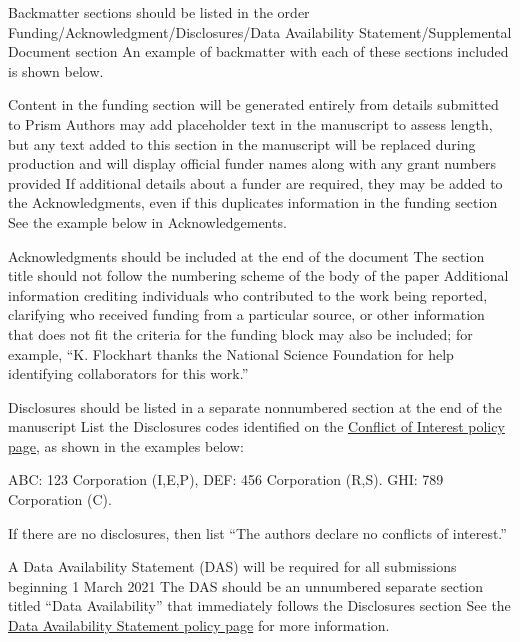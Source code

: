 \documentclass{osa-article}
\begin{document}
Backmatter sections should be listed in the order Funding/Acknowledgment/Disclosures/Data Availability Statement/Supplemental Document section
An example of backmatter with each of these sections included is shown below.

\begin{backmatter}
Content in the funding section will be generated entirely from details submitted to Prism
Authors may add placeholder text in the manuscript to assess length, but any text added to this section in the manuscript will be replaced during production and will display official funder names along with any grant numbers provided
If additional details about a funder are required, they may be added to the Acknowledgments, even if this duplicates information in the funding section
See the example below in Acknowledgements.

Acknowledgments should be included at the end of the document
The section title should not follow the numbering scheme of the body of the paper
Additional information crediting individuals who contributed to the work being reported, clarifying who received funding from a particular source, or other information that does not fit the criteria for the funding block may also be included; for example, ``K. Flockhart thanks the National Science Foundation for help identifying collaborators for this work.''

Disclosures should be listed in a separate nonnumbered section at the end of the manuscript
List the Disclosures codes identified on the \href{https://opg.optica.org/submit/review/conflicts-interest-policy.cfm}{Conflict of Interest policy page}, as shown in the examples below:

\medskip

\noindent ABC: 123 Corporation (I,E,P), DEF: 456 Corporation (R,S). GHI: 789 Corporation (C).

\medskip

\noindent If there are no disclosures, then list ``The authors declare no conflicts of interest.''


A Data Availability Statement (DAS) will be required for all submissions beginning 1 March 2021
The DAS should be an unnumbered separate section titled ``Data Availability'' that
immediately follows the Disclosures section
See the \href{https://www.osapublishing.org/submit/review/data-availability-policy.cfm}{Data Availability Statement policy page} for more information.


\end{backmatter}
\end{document}
